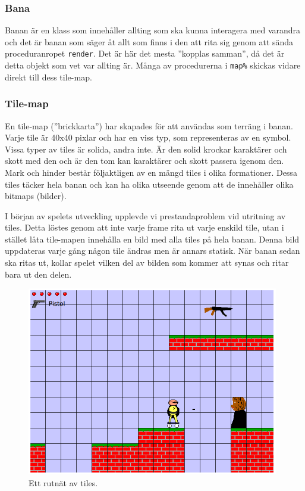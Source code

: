 \documentclass{scrartcl}
\newcommand{\code}[1]%
{\texttt{#1}}
\begin{document}
\subsubsection{Bana}
Banan är en klass som innehåller allting som ska kunna interagera med varandra och det är banan som säger åt allt som finns i den att rita sig genom att sända proceduranropet \code{render}. Det är här det mesta ''kopplas samman'', då det är detta objekt som vet var allting är. Många av procedurerna i \code{map\%} skickas vidare direkt till dess tile-map.

\subsubsection{Tile-map}
En tile-map (''brickkarta'') har skapades för att användas som terräng i banan. Varje tile är 40x40 pixlar och har en viss typ, som representeras av en symbol. Vissa typer av tiles är solida, andra inte. Är den solid krockar karaktärer och skott med den och är den tom kan karaktärer och skott passera igenom den. Mark och hinder består följaktligen av en mängd tiles i olika formationer. Dessa tiles täcker hela banan och kan ha olika utseende genom att de innehåller olika bitmaps (bilder).

I början av spelets utveckling upplevde vi prestandaproblem vid utritning av tiles. Detta löstes genom att inte varje frame rita ut varje enskild tile, utan i stället låta tile-mapen innehålla en bild med alla tiles på hela banan. Denna bild uppdateras varje gång någon tile ändras men är annars statisk. När banan sedan ska ritas ut, kollar spelet vilken del av bilden som kommer att synas och ritar bara ut den delen.

\begin{figure}[h!]
\centering
\includegraphics[width=11cm]{tilekoordinater}
\caption{Ett rutnät av tiles.}\label{tile-rutnat}
\end{figure}
\end{document}
